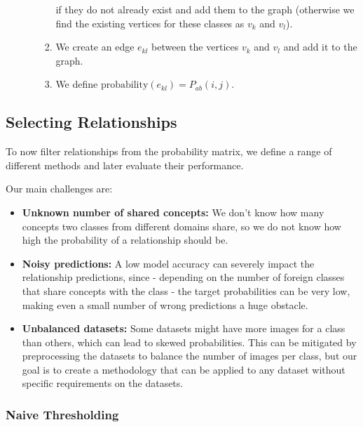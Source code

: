 \begin{enumerate}
\begin{enumerate}
\begin{enumerate}
                              if they do not already exist and add them to the graph
                              (otherwise we find the existing vertices for these classes as $v_k$ and $v_l$).
                        \item We create an edge $e_{kl}$ between the vertices $v_k$ and $v_l$ and add it to the graph.
                        \item We define $\text{probability}(e_{kl}) = P_{ab}(i, j)$.
                    \end{enumerate}
          \end{enumerate}
\end{enumerate}

\subsection{Selecting Relationships}

To now filter relationships from the probability matrix,
we define a range of different methods and later evaluate their performance.

Our main challenges are:

\begin{itemize}
    \item \textbf{Unknown number of shared concepts:} We don't know how many concepts two classes from different
          domains share, so we do not know how high the probability of a relationship should be.
    \item \textbf{Noisy predictions:} A low model accuracy can severely impact the relationship
          predictions, since - depending on the number of foreign classes that share concepts with the class -
          the target probabilities can be very low, making even a small number of wrong predictions
          a huge obstacle.
    \item \textbf{Unbalanced datasets:} Some datasets might have more images for a class than others,
          which can lead to skewed probabilities.
          This can be mitigated by preprocessing the datasets to balance the number of images per class,
          but our goal is to create a methodology that can be applied to any dataset without
          specific requirements on the datasets.
\end{itemize}

\subsubsection{Naive Thresholding}

